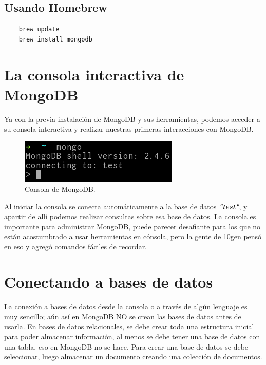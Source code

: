 \subsection*{Usando Homebrew}

\begin{lstlisting}
    brew update
    brew install mongodb
\end{lstlisting}

\section{La consola interactiva de MongoDB}

Ya con la previa instalaci\'on de MongoDB y sus herramientas, podemos acceder a su consola interactiva y realizar nuestras primeras interacciones con MongoDB.

\begin{figure}[!ht]
    \centering
    \includegraphics[scale=1]{mongodb_consola} 
    \caption[Consola de MongoDB]{Consola de MongoDB.}
\end{figure}

Al iniciar la consola se conecta autom\'aticamente a la base de datos \textit{\textbf{"test"}}, y apartir de all\'i podemos realizar consultas sobre esa base de datos. La consola es importante para administrar MongoDB, puede parecer desafiante para los que no est\'an acostumbrado a usar herramientas en c\'onsola, pero la gente de 10gen pens\'o en eso y agreg\'o comandos f\'aciles de recordar.

\section{Conectando a bases de datos}

La conexi\'on a bases de datos desde la consola o a trav\'es de alg\'un lenguaje es muy sencillo; a\'un as\'i en MongoDB NO se crean las bases de datos antes de usarla. En bases de datos relacionales, se debe crear toda una estructura inicial para poder almacenar informaci\'on, al menos se debe tener una base de datos con una tabla, eso en MongoDB no se hace. Para crear una base de datos se debe seleccionar, luego almacenar un documento creando una colecci\'on de documentos.

